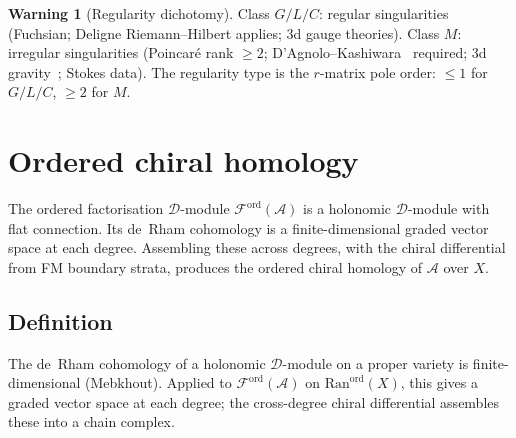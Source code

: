 \documentclass[11pt,reqno]{amsart}
\theoremstyle{definition}
\newtheorem{warning}[theorem]{Warning}
\theoremstyle{remark}
\newcommand{\cA}{\mathcal{A}}
\newcommand{\cD}{\mathcal{D}}
\newcommand{\cF}{\mathcal{F}}
\newcommand{\Ran}{\mathrm{Ran}}
\numberwithin{equation}{section}
\begin{document}
\begin{warning}[Regularity dichotomy]
\label{warn:regularity}
Class $G/L/C$: regular singularities (Fuchsian; Deligne
Riemann--Hilbert applies; $3$d gauge theories). Class $M$:
irregular singularities (Poincar\'e rank $\geq 2$;
D'Agnolo--Kashiwara~\cite{DAgnoloKashiwara16} required;
$3$d gravity~\cite{CG17}; Stokes data).
The regularity type is the $r$-matrix pole order:
$\leq 1$ for $G/L/C$, $\geq 2$ for $M$.
\end{warning}

\section{Ordered chiral homology}
\label{sec:ord-ch-hom}

The ordered factorisation $\cD$-module
$\cF^{\mathrm{ord}}(\cA)$ is a holonomic $\cD$-module with
flat connection. Its de~Rham cohomology is a
finite-dimensional graded vector space at each degree.
Assembling these across degrees, with the chiral differential
from FM boundary strata, produces the ordered chiral
homology of $\cA$ over $X$.

\subsection{Definition}
\label{subsec:ord-ch-def}

The de~Rham cohomology of a holonomic $\cD$-module on a
proper variety is finite-dimensional (Mebkhout).
Applied to $\cF^{\mathrm{ord}}(\cA)$ on
$\Ran^{\mathrm{ord}}(X)$, this gives a graded vector space
at each degree; the cross-degree chiral differential
assembles these into a chain complex.
\end{document}
